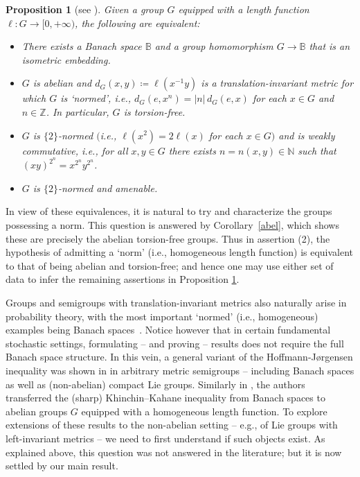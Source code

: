 \documentclass[11pt,a4paper,reqno]{amsart}
\numberwithin{equation}{section}
\theoremstyle{plain}
\newtheorem{proposition}[equation]{Proposition}
\theoremstyle{definition}
\newcommand\Z{\mathbb{Z}}
\newcommand\normsymb{\ell}  %
\newcommand\norm[1]{\ell({#1})}   %
\begin{document}
\begin{proposition}[{see \cite[Proposition 3.9]{KR2}}]\label{Pnormed}
Given a group $G$ equipped with a length function $\normsymb : G \to
[0,+\infty)$, the following are equivalent:
\begin{itemize}
\item[\textup{(1)}] There exists a Banach space $\mathbb{B}$ and a group
homomorphism $G \to \mathbb{B}$ that is an isometric embedding.

\item[\textup{(2)}] $G$ is abelian and $d_G(x,y) \coloneqq \norm{ x^{-1}
y }$ is a translation-invariant metric for which $G$ is `normed',
i.e., $d_G(e,x^n) = |n|\, d_G(e,x)$ for each $x\in G$ and $n\in \Z$. In
particular, $G$ is torsion-free.

\item[\textup{(3)}] $G$ is $\{ 2 \}$-normed \textup{$($}i.e.,
$\norm{ x^2 } = 2 \norm{ x }$ for each $x\in G$\textup{$)$} and is {\em
weakly commutative}, i.e., for all $x,y \in G$ there exists $n = n(x,y)
\in \mathbb{N}$ such that $(xy)^{2^n} = x^{2^n} y^{2^n}$.

\item[\textup{(4)}] $G$ is $\{ 2 \}$-normed and amenable.
\end{itemize}
\end{proposition}

In view of these equivalences, it is natural to try and characterize the
groups possessing a norm. This question is answered by
Corollary~\ref{abel}, which shows these are precisely the abelian
torsion-free groups. Thus in assertion (2), the hypothesis of admitting a
`norm' (i.e., homogeneous length function) is equivalent to that of being
abelian and torsion-free; and hence one may use either set of data to
infer the remaining assertions in Proposition \ref{Pnormed}.

Groups and semigroups with translation-invariant metrics also naturally
arise in probability theory, with the most important `normed' (i.e.,
homogeneous) examples being Banach spaces~\cite{LT}. Notice however that
in certain fundamental stochastic settings, formulating -- and proving --
results does not require the full Banach space structure. In this vein, a
general variant of the Hoffmann-J{\o}rgensen inequality was shown in
\cite{KR1} in arbitrary metric semigroups -- including Banach spaces as
well as (non-abelian) compact Lie groups. Similarly in \cite{KR2}, the
authors transferred the (sharp) Khinchin--Kahane inequality from Banach
spaces to abelian groups $G$ equipped with a homogeneous length function.
To explore extensions of these results to the non-abelian setting --
e.g., of Lie groups with left-invariant metrics -- we need to first
understand if such objects exist. As explained above, this question was
not answered in the literature; but it is now settled by our main result.
\end{document}
